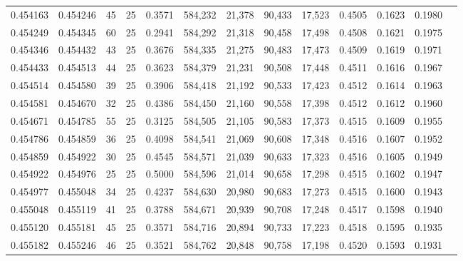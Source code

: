 \begin{tabular}{rrrrrrrrrrrrr}
0.454163 & 0.454246 &    45 &  25 &                                     0.3571 & 584,232 &  21,378 &  90,433 &  17,523 & 0.4505 & 0.1623 & 0.1980 \\
0.454249 & 0.454345 &    60 &  25 &                                     0.2941 & 584,292 &  21,318 &  90,458 &  17,498 & 0.4508 & 0.1621 & 0.1975 \\
0.454346 & 0.454432 &    43 &  25 &                                     0.3676 & 584,335 &  21,275 &  90,483 &  17,473 & 0.4509 & 0.1619 & 0.1971 \\
0.454433 & 0.454513 &    44 &  25 &                                     0.3623 & 584,379 &  21,231 &  90,508 &  17,448 & 0.4511 & 0.1616 & 0.1967 \\
0.454514 & 0.454580 &    39 &  25 &                                     0.3906 & 584,418 &  21,192 &  90,533 &  17,423 & 0.4512 & 0.1614 & 0.1963 \\
0.454581 & 0.454670 &    32 &  25 &                                     0.4386 & 584,450 &  21,160 &  90,558 &  17,398 & 0.4512 & 0.1612 & 0.1960 \\
0.454671 & 0.454785 &    55 &  25 &                                     0.3125 & 584,505 &  21,105 &  90,583 &  17,373 & 0.4515 & 0.1609 & 0.1955 \\
0.454786 & 0.454859 &    36 &  25 &                                     0.4098 & 584,541 &  21,069 &  90,608 &  17,348 & 0.4516 & 0.1607 & 0.1952 \\
0.454859 & 0.454922 &    30 &  25 &                                     0.4545 & 584,571 &  21,039 &  90,633 &  17,323 & 0.4516 & 0.1605 & 0.1949 \\
0.454922 & 0.454976 &    25 &  25 &                                     0.5000 & 584,596 &  21,014 &  90,658 &  17,298 & 0.4515 & 0.1602 & 0.1947 \\
0.454977 & 0.455048 &    34 &  25 &                                     0.4237 & 584,630 &  20,980 &  90,683 &  17,273 & 0.4515 & 0.1600 & 0.1943 \\
0.455048 & 0.455119 &    41 &  25 &                                     0.3788 & 584,671 &  20,939 &  90,708 &  17,248 & 0.4517 & 0.1598 & 0.1940 \\
0.455120 & 0.455181 &    45 &  25 &                                     0.3571 & 584,716 &  20,894 &  90,733 &  17,223 & 0.4518 & 0.1595 & 0.1935 \\
0.455182 & 0.455246 &    46 &  25 &                                     0.3521 & 584,762 &  20,848 &  90,758 &  17,198 & 0.4520 & 0.1593 & 0.1931 \\

\end{tabular}
